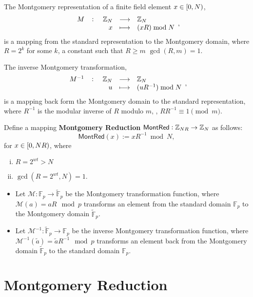\begin{tcolorbox}[colframe=defcolor,title={\color{white}\bf The Montgomery Representation and the inverse Montgomery Transformation}]
\begin{definition}
The Montgomery representation of a finite field element $x\in\intco{0,N}$, \[
\fullfunction{M}{\Z_N}{\Z_N}{x}{(xR)\bmod N},
\] is a mapping from the standard representation to the Montgomery domain, where $R=2^k$ for some $k$, a constant such that $R\geq m$ $\gcd(R,m)=1$.

The inverse Montgomery transformation, \[
\fullfunction{M^{-1}}{\Z_N}{\Z_N}{u}{(uR^{-1})\bmod N},
\] is a mapping back form the Montgomery domain to the standard representation, where $R^{-1}$ is the modular inverse of $R$ modulo $m$, \ie, $RR^{-1}\equiv 1\pmod{m}$.
\end{definition}
\end{tcolorbox}

\newpage
\begin{tcolorbox}[colframe=defcolor,title={\color{white}\bf The Montgomery Reduction}]
\begin{definition}
Define a mapping \textbf{Montgomery Reduction} $\mathsf{MontRed}:\mathbb{Z}_{NR}\to\mathbb{Z}_{N}$ as follows: \[
\mathsf{MontRed}(x):=xR^{-1}\bmod N,
\] for $x\in\intco{0,NR}$, where \begin{enumerate}[(i)]
\item $R=2^{wt}>N$
\item $\gcd(R=2^{wt}, N)=1$.
\end{enumerate}
\end{definition}	
\end{tcolorbox}
\begin{itemize}
	\item Let \( \mathcal{M} : \mathbb{F}_p \to \widetilde{\mathbb{F}}_p \) be the Montgomery transformation function, where \( \mathcal{M}(a) = aR \mod p \) transforms an element from the standard domain \( \mathbb{F}_p \) to the Montgomery domain \( \widetilde{\mathbb{F}}_p \).
	\item Let \( \mathcal{M}^{-1} : \widetilde{\mathbb{F}}_p \to \mathbb{F}_p \) be the inverse Montgomery transformation function, where \( \mathcal{M}^{-1}(\widetilde{a}) = \widetilde{a}R^{-1} \mod p \) transforms an element back from the Montgomery domain \( \widetilde{\mathbb{F}}_p \) to the standard domain \( \mathbb{F}_p \).
\end{itemize}

\newpage
\section{Montgomery Reduction}

